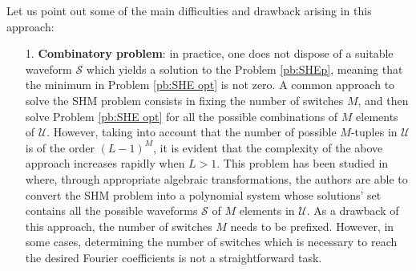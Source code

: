 \documentclass[twocolumn]{autart}    %
\begin{document}
Let us point out some of the main difficulties and drawback arising in this approach: 

\begin{itemize}
	\item[1.]\textbf{Combinatory problem}: in practice, one does not dispose of a suitable waveform $\mathcal{S}$ which yields a solution to the Problem \ref{pb:SHEp}, meaning that the minimum in Problem \ref{pb:SHE opt} is not zero. A common approach to solve the SHM problem consists in fixing the number of switches $M$, and then solve Problem \ref{pb:SHE opt} for  all the possible combinations of $M$ elements of $\mathcal{U}$. However, taking into account that the number of possible $M$-tuples  in $\mathcal U$ is of the order $(L-1)^M$, it is evident that the complexity of the above approach increases rapidly when $L>1$. This problem has been studied in \cite{Yang2015} where, through appropriate algebraic transformations, the authors are able to convert the SHM problem into a polynomial system whose solutions' set contains all the possible waveforms $\mathcal S$ of $M$ elements in $\mathcal{U}$. As a drawback of this approach, the number of switches $M$ needs to be prefixed. However, in some cases,  determining the number of switches which is necessary to reach the desired Fourier coefficients is not a straightforward task.


\end{itemize}
\end{document}
